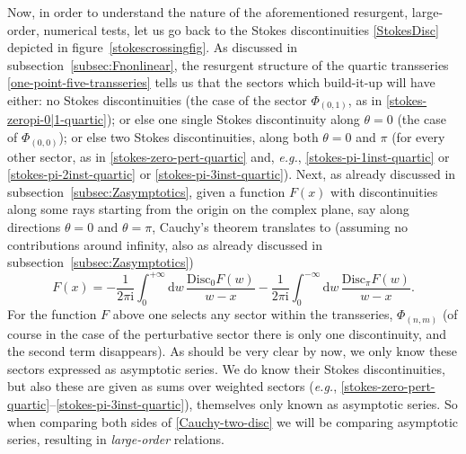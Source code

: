 \documentclass[11pt,a4paper]{article}
\newcommand{\be}{\begin{equation}}
\newcommand{\ee}{\end{equation}}
\def\disc{{\mathrm{Disc}}}
\newcommand{\rmi}{{\mathrm{i}}}
\newcommand{\rmd}{{\mathrm{d}}}
\begin{document}
Now, in order to understand the nature of the aforementioned resurgent, large-order, numerical tests, let us go back to the Stokes discontinuities \eqref{StokesDisc} depicted in figure~\ref{stokescrossingfig}. As discussed in subsection~\ref{subsec:Fnonlinear}, the resurgent structure of the quartic transseries \eqref{one-point-five-transseries} tells us that the sectors which build-it-up will have either: no Stokes discontinuities (the case of the sector $\Phi_{(0,1)}$, as in \eqref{stokes-zeropi-0|1-quartic}); or else one single Stokes discontinuity along $\theta=0$ (the case of $\Phi_{(0,0)}$); or else two Stokes discontinuities, along both $\theta=0$ and $\pi$ (for every other sector, as in \eqref{stokes-zero-pert-quartic} and, \textit{e.g.}, \eqref{stokes-pi-1inst-quartic} or \eqref{stokes-pi-2inst-quartic} or \eqref{stokes-pi-3inst-quartic}). Next, as already discussed in subsection~\ref{subsec:Zasymptotics}, given a function $F(x)$ with discontinuities along some rays starting from the origin on the complex plane, say along directions $\theta=0$ and $\theta=\pi$, Cauchy's theorem translates to (assuming no contributions around infinity, also as already discussed in subsection~\ref{subsec:Zasymptotics})
%
\be
\label{Cauchy-two-disc}
F(x) = - \frac{1}{2\pi\rmi} \int_{0}^{+\infty} \rmd w\, \frac{\disc_{0}F(w)}{w-x} - \frac{1}{2\pi\rmi} \int_{0}^{-\infty} \rmd w\, \frac{\disc_{\pi}F(w)}{w-x}.
\ee
%
\noindent
For the function $F$ above one selects any sector within the transseries, $\Phi_{(n,m)}$ (of course in the case of the perturbative sector there is only one discontinuity, and the second term disappears). As should be very clear by now, we only know these sectors expressed as asymptotic series. We do know their Stokes discontinuities, but also these are given as sums over weighted sectors (\textit{e.g.}, \eqref{stokes-zero-pert-quartic}--\eqref{stokes-pi-3inst-quartic}), themselves only known as asymptotic series. So when comparing both sides of \eqref{Cauchy-two-disc} we will be comparing asymptotic series, resulting in \textit{large-order} relations.
\end{document}
